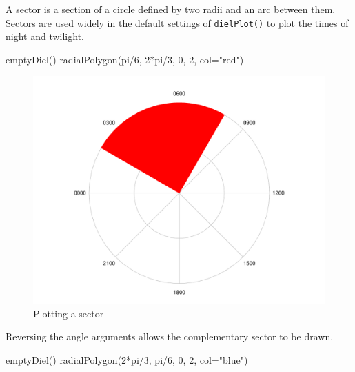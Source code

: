 \documentclass[
]{book}
\newenvironment{Shaded}{\begin{snugshade}}{\end{snugshade}}
\newcommand{\AttributeTok}[1]{\textcolor[rgb]{0.77,0.63,0.00}{#1}}
\newcommand{\DecValTok}[1]{\textcolor[rgb]{0.00,0.00,0.81}{#1}}
\newcommand{\FunctionTok}[1]{\textcolor[rgb]{0.00,0.00,0.00}{#1}}
\newcommand{\NormalTok}[1]{#1}
\newcommand{\SpecialCharTok}[1]{\textcolor[rgb]{0.00,0.00,0.00}{#1}}
\newcommand{\StringTok}[1]{\textcolor[rgb]{0.31,0.60,0.02}{#1}}
\begin{document}
A sector is a section of a circle defined by two radii and an arc between them. Sectors are used widely in the default settings of \texttt{dielPlot()} to plot the times of night and twilight.

\begin{Shaded}
\begin{Highlighting}[]
\FunctionTok{emptyDiel}\NormalTok{()}
\FunctionTok{radialPolygon}\NormalTok{(pi}\SpecialCharTok{/}\DecValTok{6}\NormalTok{, }\DecValTok{2}\SpecialCharTok{*}\NormalTok{pi}\SpecialCharTok{/}\DecValTok{3}\NormalTok{, }\DecValTok{0}\NormalTok{, }\DecValTok{2}\NormalTok{, }\AttributeTok{col=}\StringTok{"red"}\NormalTok{)}
\end{Highlighting}
\end{Shaded}

\begin{figure}

{\centering \includegraphics[width=0.9\linewidth]{_main_files/figure-latex/radialPolygon-sector-1} 

}

\caption{Plotting a sector}\label{fig:radialPolygon-sector}
\end{figure}

Reversing the angle arguments allows the complementary sector to be drawn.

\begin{Shaded}
\begin{Highlighting}[]
\FunctionTok{emptyDiel}\NormalTok{()}
\FunctionTok{radialPolygon}\NormalTok{(}\DecValTok{2}\SpecialCharTok{*}\NormalTok{pi}\SpecialCharTok{/}\DecValTok{3}\NormalTok{, pi}\SpecialCharTok{/}\DecValTok{6}\NormalTok{, }\DecValTok{0}\NormalTok{, }\DecValTok{2}\NormalTok{, }\AttributeTok{col=}\StringTok{"blue"}\NormalTok{)}
\end{Highlighting}
\end{Shaded}
\end{document}
